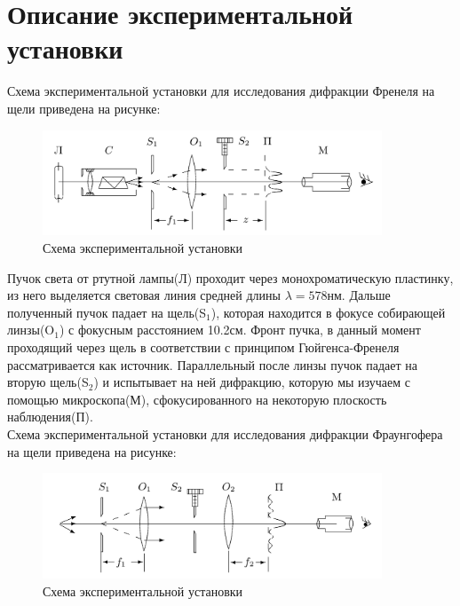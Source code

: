 \section*{Описание экспериментальной установки}

Схема экспериментальной установки для исследования дифракции Френеля на щели приведена на рисунке:

\begin{figure}[H]
	\centering
	\includegraphics[width=0.9\textwidth]{../Изображения/Схема установки. Дифракция Френеля.png}
	\caption{Схема экспериментальной установки}
\end{figure}

Пучок света от ртутной лампы(Л) проходит через монохроматическую пластинку, из него выделяется световая линия средней длины $\lambda = 578 нм$. Дальше полученный пучок падает на щель(S$_1$), которая находится в фокусе собирающей линзы(O$_1$) с фокусным расстоянием 10.2см. Фронт пучка, в данный момент проходящий через щель в соответствии с принципом Гюйгенса-Френеля рассматривается как источник. Параллельный после линзы пучок падает на вторую щель(S$_2$) и испытывает на ней дифракцию, которую мы изучаем с помощью микроскопа(М), сфокусированного на некоторую плоскость наблюдения(П).\\

Схема экспериментальной установки для исследования дифракции Фраунгофера на щели приведена на рисунке:

\begin{figure}[H]
	\centering
	\includegraphics[width=0.9\textwidth]{../Изображения/Схема установки. Дифракция Фраунгофера.png}
	\caption{Схема экспериментальной установки}
\end{figure}


